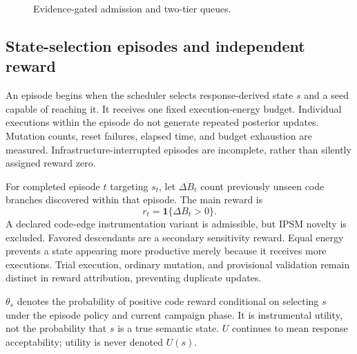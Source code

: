 \documentclass[final,5p,times,number]{elsarticle}
\begin{document}
\begin{figure}[!tbp]
\caption{Evidence-gated admission and two-tier queues.}
\label{fig:architecture}
\end{figure}

\subsection{State-selection episodes and independent reward}
An episode begins when the scheduler selects response-derived state $s$ and a seed capable of reaching it. It receives one fixed execution-energy budget. Individual executions within the episode do not generate repeated posterior updates. Mutation counts, reset failures, elapsed time, and budget exhaustion are measured. Infrastructure-interrupted episodes are incomplete, rather than silently assigned reward zero.

For completed episode $t$ targeting $s_t$, let $\Delta B_t$ count previously unseen code branches discovered within that episode. The main reward is
\begin{equation}
r_t=\mathbf{1}\{\Delta B_t>0\}.
\label{eq:reward}
\end{equation}
A declared code-edge instrumentation variant is admissible, but IPSM novelty is excluded. Favored descendants are a secondary sensitivity reward. Equal energy prevents a state appearing more productive merely because it receives more executions. Trial execution, ordinary mutation, and provisional validation remain distinct in reward attribution, preventing duplicate updates.

$\theta_s$ denotes the probability of positive code reward conditional on selecting $s$ under the episode policy and current campaign phase. It is instrumental utility, not the probability that $s$ is a true semantic state. $U$ continues to mean response acceptability; utility is never denoted $U(s)$.
\end{document}
